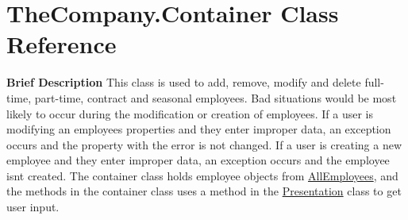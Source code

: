 \hypertarget{class_the_company_1_1_container}{}\section{The\+Company.\+Container Class Reference}
\label{class_the_company_1_1_container}


{\bfseries Brief Description} This class is used to add, remove, modify and delete full-\/time, part-\/time, contract and seasonal employees. Bad situations would be most likely to occur during the modification or creation of employees. If a user is modifying an employee\textquotesingle{}s properties and they enter improper data, an exception occurs and the property with the error is not changed. If a user is creating a new employee and they enter improper data, an exception occurs and the employee isn\textquotesingle{}t created. The container class holds employee objects from \hyperlink{namespace_all_employees}{All\+Employees}, and the methods in the container class uses a method in the \hyperlink{namespace_presentation}{Presentation} class to get user input.  


